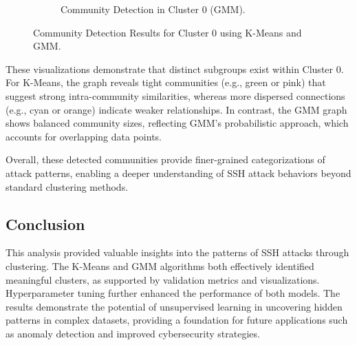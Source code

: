 \begin{figure}[H]
\begin{subfigure}[c]{0.47\textwidth}
                    \caption{Community Detection in Cluster 0 (GMM).}
                    \label{fig:gmm_graph}
                \end{subfigure}
                \vspace{-0.1cm}
                \caption{Community Detection Results for Cluster 0 using K-Means and GMM.}
            \end{figure}
            
            These visualizations demonstrate that distinct subgroups exist within Cluster 0. For K-Means, the graph reveals tight communities (e.g., green or pink) that suggest strong intra-community similarities, whereas more dispersed connections (e.g., cyan or orange) indicate weaker relationships. In contrast, the GMM graph shows balanced community sizes, reflecting GMM's probabilistic approach, which accounts for overlapping data points. 
            
            Overall, these detected communities provide finer-grained categorizations of attack patterns, enabling a deeper understanding of SSH attack behaviors beyond standard clustering methods.
            

    \subsection{Conclusion}
    
        This analysis provided valuable insights into the patterns of SSH attacks through clustering. The K-Means and GMM algorithms both effectively identified meaningful clusters, as supported by validation metrics and visualizations. Hyperparameter tuning further enhanced the performance of both models. The results demonstrate the potential of unsupervised learning in uncovering hidden patterns in complex datasets, providing a foundation for future applications such as anomaly detection and improved cybersecurity strategies.

